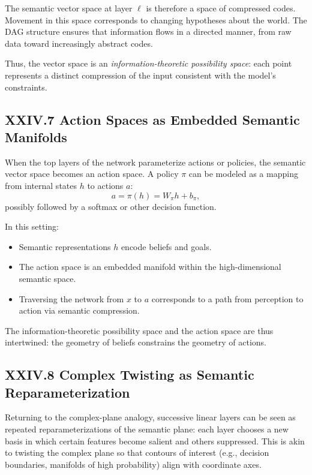 \documentclass[12pt,letterpaper]{article}
\begin{document}
The semantic vector space at layer $\ell$ is therefore a space of compressed codes. Movement in this space corresponds to changing hypotheses about the world. The DAG structure ensures that information flows in a directed manner, from raw data toward increasingly abstract codes.

Thus, the vector space is an \emph{information-theoretic possibility space}: each point represents a distinct compression of the input consistent with the model’s constraints.

\subsection{XXIV.7 Action Spaces as Embedded Semantic Manifolds}

When the top layers of the network parameterize actions or policies, the semantic vector space becomes an action space. A policy $\pi$ can be modeled as a mapping from internal states $h$ to actions $a$:
\[
a = \pi(h) = W_{\pi} h + b_{\pi},
\]
possibly followed by a softmax or other decision function.

In this setting:

\begin{itemize}
    \item Semantic representations $h$ encode beliefs and goals.
    \item The action space is an embedded manifold within the high-dimensional semantic space.
    \item Traversing the network from $x$ to $a$ corresponds to a path from perception to action via semantic compression.
\end{itemize}

The information-theoretic possibility space and the action space are thus intertwined: the geometry of beliefs constrains the geometry of actions.

\subsection{XXIV.8 Complex Twisting as Semantic Reparameterization}

Returning to the complex-plane analogy, successive linear layers can be seen as repeated reparameterizations of the semantic plane: each layer chooses a new basis in which certain features become salient and others suppressed. This is akin to twisting the complex plane so that contours of interest (e.g., decision boundaries, manifolds of high probability) align with coordinate axes.
\end{document}
